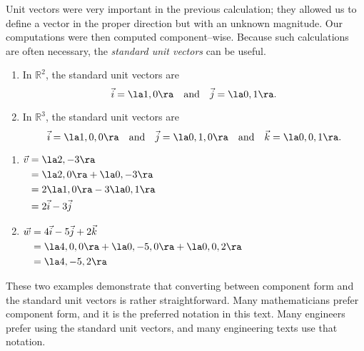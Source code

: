 Unit vectors were very important in the previous calculation; they allowed us to define a vector in the proper direction but with an unknown magnitude. Our computations were then computed component--wise. Because such calculations are often necessary, the \textit{standard unit vectors} can be useful.

{\begin{enumerate}
	\item In $\mathbb{R}^2$, the standard unit vectors are
	\[
	\vec i = \la 1,0\ra \quad \text{and}\quad \vec j = \la 0,1\ra.
	\]
	\item In $\mathbb{R}^3$, the standard unit vectors are
	\[
	\vec i = \la 1,0,0\ra \quad \text{and}\quad \vec j = \la 0,1,0\ra \quad \text{and}\quad \vec k = \la 0,0,1\ra.
	\]
\end{enumerate}
}

\pagebreak

{\begin{enumerate}
	\item  \hfill$\displaystyle \begin{aligned}[t]
					\vec v &= \la 2,-3\ra \\
								&= \la 2,0\ra + \la 0,-3\ra \\
								&= 2\la 1,0\ra -3\la 0,1\ra\\
								&= 2\vec i - 3\vec j
				\end{aligned}$\hfill\null
	
	\item	\hfill $\displaystyle \begin{aligned}[t]
				\vec w &= 4\vec i - 5\vec j +2\vec k\\
							&= \la 4,0,0\ra +\la 0,-5,0\ra + \la 0,0,2\ra \\
							&= \la 4,-5,2\ra
							\end{aligned}$\hfill\null
\end{enumerate}
These two examples demonstrate that converting between component form and the standard unit vectors is rather straightforward. Many mathematicians prefer component form, and it is the preferred notation in this text. Many engineers prefer using the standard unit vectors, and many engineering texts use that notation.
}\\

